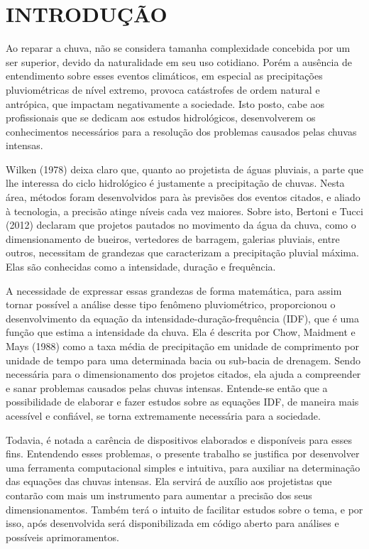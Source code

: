 \onehalfspacing
\chapter{INTRODUÇÃO}

Ao reparar a chuva, não se considera tamanha complexidade concebida por um ser superior, devido da naturalidade em seu uso cotidiano. Porém a ausência de entendimento sobre esses eventos climáticos, em especial as precipitações pluviométricas de nível extremo, provoca catástrofes de ordem natural e antrópica, que impactam negativamente a sociedade. Isto posto, cabe aos profissionais que se dedicam aos estudos hidrológicos, desenvolverem os conhecimentos necessários para a resolução dos problemas causados pelas chuvas intensas.

Wilken (1978) deixa claro que, quanto ao projetista de águas pluviais, a parte que lhe interessa do ciclo hidrológico é justamente a precipitação de chuvas. Nesta área, métodos foram desenvolvidos para às previsões dos eventos citados, e aliado à tecnologia, a precisão atinge níveis cada vez maiores. Sobre isto, Bertoni e Tucci (2012) declaram que projetos pautados no movimento da água da chuva, como o dimensionamento de bueiros, vertedores de barragem, galerias pluviais, entre outros, necessitam de grandezas que caracterizam a precipitação pluvial máxima. Elas são conhecidas como a intensidade, duração e frequência.

A necessidade de expressar essas grandezas de forma matemática, para assim tornar possível a análise desse tipo fenômeno pluviométrico, proporcionou o desenvolvimento da equação da intensidade-duração-frequência (IDF), que é uma função que estima a intensidade da chuva. Ela é descrita por Chow, Maidment e Mays (1988) como a taxa média de precipitação em unidade de comprimento por unidade de tempo para uma determinada bacia ou sub-bacia de drenagem. Sendo necessária para o dimensionamento dos projetos citados, ela ajuda a compreender e sanar problemas causados pelas chuvas intensas. Entende-se então que a possibilidade de elaborar e fazer estudos sobre as equações IDF, de maneira mais acessível e confiável, se torna extremamente necessária para a sociedade. 

Todavia, é notada a carência de dispositivos elaborados e disponíveis para esses fins. Entendendo esses problemas, o presente trabalho se justifica por desenvolver uma ferramenta computacional simples e intuitiva, para auxiliar na determinação das equações das chuvas intensas. Ela servirá de auxílio aos projetistas que contarão com mais um instrumento para aumentar a precisão dos seus dimensionamentos. Também terá o intuito de facilitar estudos sobre o tema, e por isso, após desenvolvida será disponibilizada em código aberto para análises e possíveis aprimoramentos.
